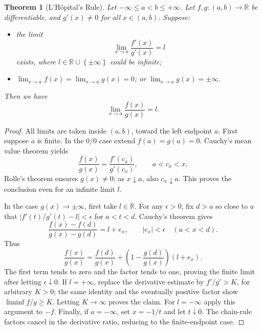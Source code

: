 \documentclass[11pt]{article}
\numberwithin{equation}{section}
\newtheorem{theorem}{Theorem}[section]
\theoremstyle{definition}
\theoremstyle{remark}
\newcommand{\pqty}[1]{\left(#1\right)}
\newcommand{\Bqty}[1]{\left\{#1\right\}}
\newcommand{\oointv}[2]{(#1,#2)}
\newcommand{\functiondomain}[3]{#1:#2\to #3}
\newcommand{\RR}{\mathbb R}
\newcommand{\plusinfty}{+\infty}
\newcommand{\minusinfty}{-\infty}
\newcommand{\pminfty}{\pm\infty}
\begin{document}
\begin{theorem}[L'H\^{o}pital's Rule]\label{analysis-unit-0120}
    \label{thm:l-hopitals}%
    Let \(\minusinfty \leq a < b \leq \plusinfty\). Let \(\functiondomain{f, g}{\oointv{a}{b}}{\RR}\) be differentiable, and \(g'\pqty{x} \neq 0\) for all \(x \in \oointv{a}{b}\). Suppose:
    \begin{itemize}
        \item the limit
        \[
            \lim_{x \to a} \frac{f'\pqty{x}}{g'\pqty{x}} = l
        \]
        exists, where \(l \in \RR \cup \Bqty{\pminfty}\) could be infinite;
        \item \(\lim_{x \to a} f\pqty{x} = \lim_{x \to a} g\pqty{x} = 0\); or \(\lim_{x \to a} g\pqty{x} = \pminfty\).
    \end{itemize}

    Then we have
    \[
        \lim_{x \to a} \frac{f\pqty{x}}{g\pqty{x}} = l.
    \]
\end{theorem}

\begin{proof}
All limits are taken inside \((a,b)\), toward the left endpoint \(a\).
First suppose \(a\) is finite. In the \(0/0\) case extend \(f(a)=g(a)=0\).
Cauchy's mean value theorem yields
\[
\frac{f(x)}{g(x)}=\frac{f'(c_x)}{g'(c_x)},\qquad a<c_x<x.
\]
Rolle's theorem ensures \(g(x)\ne0\); as \(x\downarrow a\), also \(c_x\downarrow a\).
This proves the conclusion even for an infinite limit \(l\).

In the case \(g(x)\to\pm\infty\), first take \(l\in\mathbb R\).
For any \(\epsilon>0\), fix \(d>a\) so close to \(a\) that
\(|f'(t)/g'(t)-l|<\epsilon\) for \(a<t<d\). Cauchy's theorem gives
\[
\frac{f(x)-f(d)}{g(x)-g(d)}=l+e_x,\qquad |e_x|<\epsilon\quad(a<x<d).
\]
Thus
\[
\frac{f(x)}{g(x)}=\frac{f(d)}{g(x)}+
\left(1-\frac{g(d)}{g(x)}\right)(l+e_x).
\]
The first term tends to zero and the factor tends to one, proving the finite
limit after letting \(\epsilon\downarrow0\).
If \(l=+\infty\), replace the derivative estimate by \(f'/g'>K\), for arbitrary
\(K>0\); the same identity and the eventually positive factor show
\(\liminf f/g\ge K\). Letting \(K\to\infty\) proves the claim. For \(l=-\infty\)
apply this argument to \(-f\).
Finally, if \(a=-\infty\), set \(x=-1/t\) and let \(t\downarrow0\).
The chain-rule factors cancel in the derivative ratio, reducing to the finite-endpoint case.
\end{proof}
\end{document}
